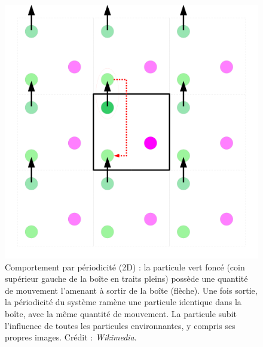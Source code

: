 	\begin{figure}[H]
		\centering
		\includegraphics[width=\textwidth]{figures/ch1/period}
		\caption{Comportement par périodicité (2D) : la particule vert foncé (coin supérieur gauche de la boîte en traits pleins) possède une quantité de mouvement l'amenant à sortir de la boîte (flèche). Une fois sortie, la périodicité du système ramène une particule identique dans la boîte, avec la même quantité de mouvement. La particule subit l'influence de toutes les particules environnantes, y compris ses propres images. Crédit : \emph{Wikimedia}.}
		\label{fig:period}
	\end{figure}
	
